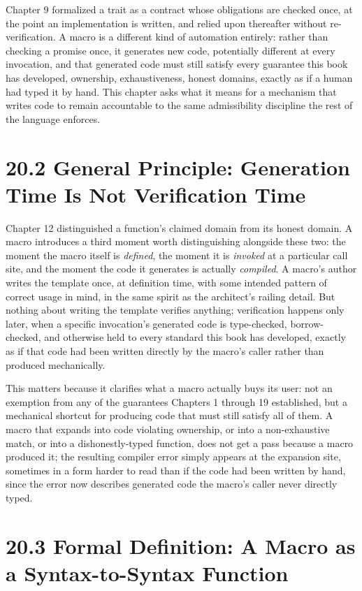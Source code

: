 \documentclass[11pt]{book}
\begin{document}
Chapter 9 formalized a trait as a contract whose obligations are checked once, at the point an implementation is written, and relied upon thereafter without re-verification. A macro is a different kind of automation entirely: rather than checking a promise once, it generates new code, potentially different at every invocation, and that generated code must still satisfy every guarantee this book has developed, ownership, exhaustiveness, honest domains, exactly as if a human had typed it by hand. This chapter asks what it means for a mechanism that writes code to remain accountable to the same admissibility discipline the rest of the language enforces.

\section*{20.2 General Principle: Generation Time Is Not Verification Time}

Chapter 12 distinguished a function's claimed domain from its honest domain. A macro introduces a third moment worth distinguishing alongside these two: the moment the macro itself is \emph{defined}, the moment it is \emph{invoked} at a particular call site, and the moment the code it generates is actually \emph{compiled}. A macro's author writes the template once, at definition time, with some intended pattern of correct usage in mind, in the same spirit as the architect's railing detail. But nothing about writing the template verifies anything; verification happens only later, when a specific invocation's generated code is type-checked, borrow-checked, and otherwise held to every standard this book has developed, exactly as if that code had been written directly by the macro's caller rather than produced mechanically.

This matters because it clarifies what a macro actually buys its user: not an exemption from any of the guarantees Chapters 1 through 19 established, but a mechanical shortcut for producing code that must still satisfy all of them. A macro that expands into code violating ownership, or into a non-exhaustive match, or into a dishonestly-typed function, does not get a pass because a macro produced it; the resulting compiler error simply appears at the expansion site, sometimes in a form harder to read than if the code had been written by hand, since the error now describes generated code the macro's caller never directly typed.

\section*{20.3 Formal Definition: A Macro as a Syntax-to-Syntax Function}
\end{document}
